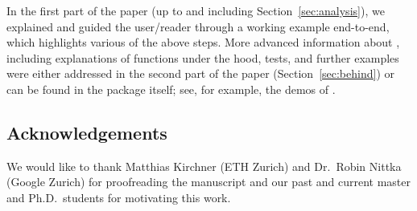 \documentclass[article]{jss}
\theoremstyle{mythmstyle}%
\begin{document}
In the first part of the paper (up to and including Section~\ref{sec:analysis}),
we explained and guided the user/reader through a working example end-to-end,
which highlights various of the above steps. More advanced information about
, including explanations of functions under the hood, tests, and
further examples were either addressed in the second part of the paper
(Section~\ref{sec:behind}) or can be found in the package itself; see, for
example, the demos of .

\subsection*{Acknowledgements}
We would like to thank Matthias Kirchner (ETH Zurich) and Dr.\ Robin Nittka (Google
Zurich) for proofreading the manuscript and our past and current
master and Ph.D.\ students for motivating this work.


\nocite{murrell-gridBase%
,yu-RMpi%
,RevA-foreach%
,dahl-xtable%
,tierneyRLS-snow%
,maechler-sfsmisc%
}

\end{document}
